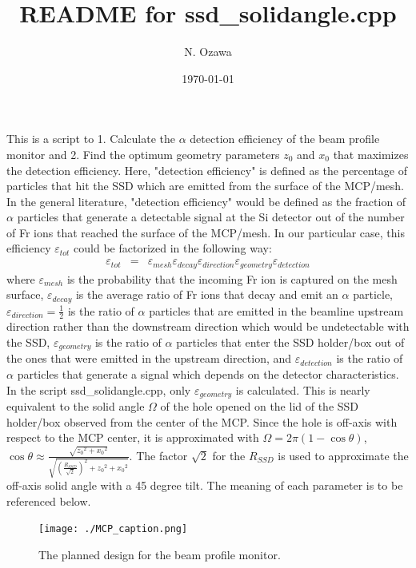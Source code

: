 \documentclass{article}
\title{README for ssd\_solidangle.cpp}
\author{N. Ozawa}
\date{\today}
\begin{document}
\maketitle

This is a script to 1. Calculate the $\alpha$ detection efficiency of the beam profile monitor and 2. Find the optimum geometry parameters $z_0$ and $x_0$ that maximizes the detection efficiency. Here, "detection efficiency" is defined as the percentage of particles that hit the SSD which are emitted from the surface of the MCP/mesh. In the general literature, "detection efficiency" would be defined as the fraction of $\alpha$ particles that generate a detectable signal at the Si detector out of the number of Fr ions that reached the surface of the MCP/mesh. In our particular case, this efficiency $\varepsilon_{tot}$ could be factorized in the following way:
\begin{eqnarray*}
\varepsilon_{tot} & = & \varepsilon_{mesh} \varepsilon_{decay} \varepsilon_{direction} \varepsilon_{geometry} \varepsilon_{detection}
\end{eqnarray*}
where $\varepsilon_{mesh}$ is the probability that the incoming Fr ion is captured on the mesh surface, $\varepsilon_{decay}$ is the average ratio of Fr ions that decay and emit an $\alpha$ particle, $\varepsilon_{direction} = \frac{1}{2}$ is the ratio of $\alpha$ particles that are emitted in the beamline upstream direction rather than the downstream direction which would be undetectable with the SSD, $\varepsilon_{geometry}$ is the ratio of $\alpha$ particles that enter the SSD holder/box out of the ones that were emitted in the upstream direction, and $\varepsilon_{detection}$ is the ratio of $\alpha$ particles that generate a signal which depends on the detector characteristics. In the script ssd\_solidangle.cpp, only $\varepsilon_{geometry}$ is calculated. This is nearly equivalent to the solid angle $\Omega$ of the hole opened on the lid of the SSD holder/box observed from the center of the MCP. Since the hole is off-axis with respect to the MCP center, it is approximated with $\Omega = 2\pi (1 - \cos{\theta})$, $\cos{\theta} \approx \frac{\sqrt{{z_0}^2+{x_0}^2 }}{\sqrt{\left(\frac{R_{SSD}}{\sqrt{2}}\right)^2 + {z_0}^2 + {x_0}^2}}$. The factor $\sqrt{2}$ for the $R_{SSD}$ is used to approximate the off-axis solid angle with a 45 degree tilt. The meaning of each parameter is to be referenced below. \\

\begin{figure}[H]
  \begin{center}
    \texttt{[image: ./MCP\_caption.png]}
    \caption{The planned design for the beam profile monitor.}
    \label{fig:MCP_caption}
  \end{center}
\end{figure}
\end{document}
